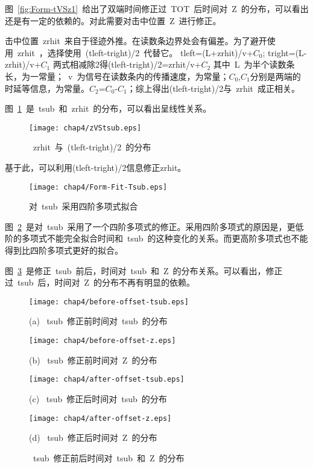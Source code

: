 图~\ref{fig:Form-tVSz1}~给出了双端时间修正过~TOT~后时间对~Z~的分布，可以看出还是有一定的依赖的。对此需要对击中位置~Z~进行修正。

击中位置~zrhit~来自于径迹外推。在读数条边界处会有偏差。为了避开使用~zrhit~，选择使用~(tleft-tright)/2~代替它。
tleft=(L+zrhit)/v+$C_{0}$;
tright=(L-zrhit)/v+$C_{1}$
两式相减除2得(tleft-tright)/2=zrhit/v+$C_{2}$
其中~L~为半个读数条长，为一常量；~v~为信号在读数条内的传播速度，为常量；$C_{0}$,$C_{1}$分别是两端的时延等信息，为常量。$C_{2}$=$C_{0}$-$C_{1}$；综上得出(tleft-tright)/2与~zrhit~成正相关。

图~\ref{fig:zVStsub}~是~tsub~和~zrhit~的分布，可以看出呈线性关系。
\begin{figure}[!h]
\centering
\texttt{[image: chap4/zVStsub.eps]}
\caption{~zrhit~与~(tleft-tright)/2~的分布}
\label{fig:zVStsub}
\end{figure}

基于此，可以利用(tleft-tright)/2信息修正zrhit。

\begin{figure}[!h]
\centering
\texttt{[image: chap4/Form-Fit-Tsub.eps]}
\caption{对~tsub~采用四阶多项式拟合}
\label{fig:Form-Fit-Tsub}
\end{figure}

图~\ref{fig:Form-Fit-Tsub}~是对~tsub~采用了一个四阶多项式的修正。采用四阶多项式的原因是，更低阶的多项式不能完全拟合时间和~tsub~的这种变化的关系。而更高阶多项式也不能得到比四阶多项式更好的拟合。

图~\ref{fig:Fit-Tsub}~是修正~tsub~前后，时间对~tsub~和~Z~的分布关系。可以看出，修正过~tsub~后，时间对~Z~的分布不再有明显的依赖。
\begin{figure}[!h]
\begin{minipage}{0.5\linewidth}
  \centerline{\texttt{[image: chap4/before-offset-tsub.eps]}}
  \centerline{(a) ~tsub~修正前时间对~tsub~的分布}
  \centerline{\label{fig:before-offset-tsub}}
\end{minipage}
\hfill
\begin{minipage}{0.5\linewidth}
  \centerline{\texttt{[image: chap4/before-offset-z.eps]}}
  \centerline{(b) ~tsub~修正前时间对~Z~的分布}
  \centerline{\label{fig:before-offset-z}}
\end{minipage}
\vfill
\begin{minipage}{0.5\linewidth}
  \centerline{\texttt{[image: chap4/after-offset-tsub.eps]}}
  \centerline{(c) ~tsub~修正后时间对~tsub~的分布}
  \centerline{\label{fig:after-offset-tsub}}
\end{minipage}
\hfill
\begin{minipage}{0.5\linewidth}
  \centerline{\texttt{[image: chap4/after-offset-z.eps]}}
  \centerline{(d) ~tsub~修正后时间对~Z~的分布}
  \centerline{\label{fig:after-offset-z}}
\end{minipage}
\caption{~tsub~修正前后时间对~tsub~和~Z~的分布}
\label{fig:Fit-Tsub}
\end{figure}

